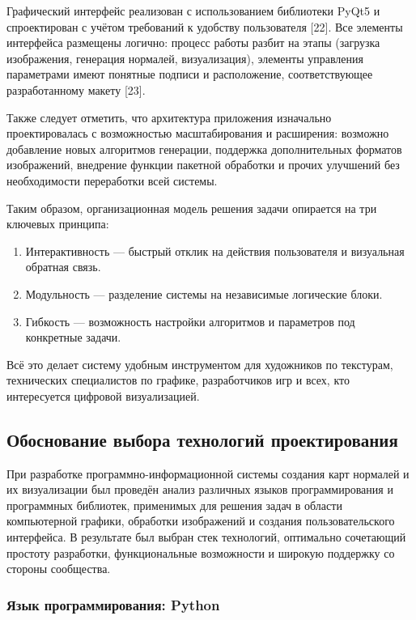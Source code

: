 Графический интерфейс реализован с использованием библиотеки PyQt5 и спроектирован с учётом требований к удобству пользователя [22]. Все элементы интерфейса размещены логично: процесс работы разбит на этапы (загрузка изображения, генерация нормалей, визуализация), элементы управления параметрами имеют понятные подписи и расположение, соответствующее разработанному макету [23].

Также следует отметить, что архитектура приложения изначально проектировалась с возможностью масштабирования и расширения: возможно добавление новых алгоритмов генерации, поддержка дополнительных форматов изображений, внедрение функции пакетной обработки и прочих улучшений без необходимости переработки всей системы.

Таким образом, организационная модель решения задачи опирается на три ключевых принципа:
\begin{enumerate}
	\item Интерактивность — быстрый отклик на действия пользователя и визуальная обратная связь.
	\item Модульность — разделение системы на независимые логические блоки.
	\item Гибкость — возможность настройки алгоритмов и параметров под конкретные задачи.
\end{enumerate}

Всё это делает систему удобным инструментом для художников по текстурам, технических специалистов по графике, разработчиков игр и всех, кто интересуется цифровой визуализацией.
\subsection{Обоснование выбора технологий проектирования}

При разработке программно-информационной системы создания карт нормалей и их визуализации был проведён анализ различных языков программирования и программных библиотек, применимых для решения задач в области компьютерной графики, обработки изображений и создания пользовательского интерфейса. В результате был выбран стек технологий, оптимально сочетающий простоту разработки, функциональные возможности и широкую поддержку со стороны сообщества.
\subsubsection{Язык программирования: Python}


